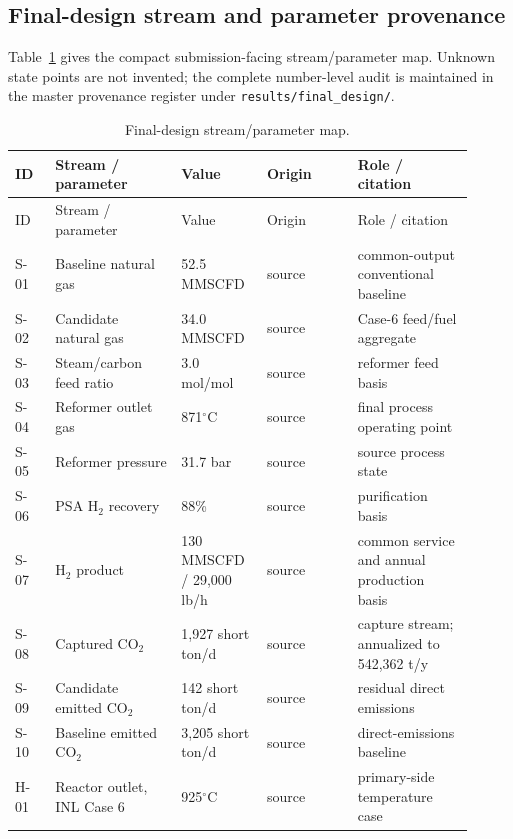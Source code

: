 \subsection{Final-design stream and parameter provenance}
Table~\ref{tab:stream-parameters} gives the compact submission-facing stream/parameter map. Unknown state points are not invented; the complete number-level audit is maintained in the master provenance register under \texttt{results/final\_design/}.

\begin{longtable}{p{0.08\linewidth}p{0.25\linewidth}p{0.17\linewidth}p{0.18\linewidth}p{0.23\linewidth}}
\caption{Final-design stream/parameter map.}\label{tab:stream-parameters}\\
\toprule ID & Stream / parameter & Value & Origin & Role / citation \\ \midrule
\endfirsthead
\toprule ID & Stream / parameter & Value & Origin & Role / citation \\ \midrule
\endhead
S-01 & Baseline natural gas & 52.5 MMSCFD & source & common-output conventional baseline~\cite{inltev953}\\
S-02 & Candidate natural gas & 34.0 MMSCFD & source & Case-6 feed/fuel aggregate~\cite{inltev961}\\
S-03 & Steam/carbon feed ratio & 3.0 mol/mol & source & reformer feed basis~\cite{inltev953}\\
S-04 & Reformer outlet gas & 871$^\circ$C & source & final process operating point~\cite{inltev953,inltev961}\\
S-05 & Reformer pressure & 31.7 bar & source & source process state~\cite{inltev953,inltev961}\\
S-06 & PSA H$_2$ recovery & 88\% & source & purification basis~\cite{inltev953}\\
S-07 & H$_2$ product & 130 MMSCFD / 29,000 lb/h & source & common service and annual production basis~\cite{inltev953,inltev961}\\
S-08 & Captured CO$_2$ & 1,927 short ton/d & source & capture stream; annualized to 542,362 t/y~\cite{inltev961}\\
S-09 & Candidate emitted CO$_2$ & 142 short ton/d & source & residual direct emissions~\cite{inltev961}\\
S-10 & Baseline emitted CO$_2$ & 3,205 short ton/d & source & direct-emissions baseline~\cite{inltev953}\\
H-01 & Reactor outlet, INL Case 6 & 925$^\circ$C & source & primary-side temperature case~\cite{inltev961}\\

\end{longtable}
